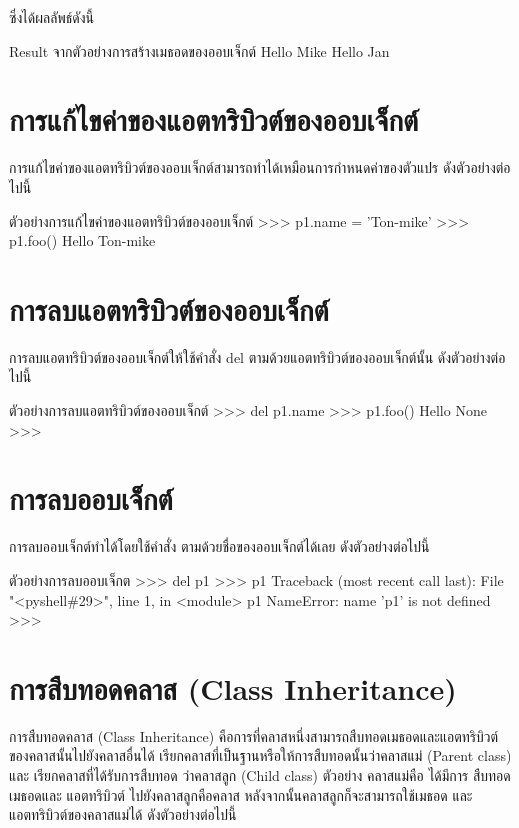 ซึ่งได้ผลลัพธ์ดังนี้
\begin{codelist}{Result จากตัวอย่างการสร้างเมธอดของออบเจ็กต์}{}
Hello Mike
Hello Jan
\end{codelist}


\section{การแก้ไขค่าของแอตทริบิวต์ของออบเจ็กต์}

การแก้ไขค่าของแอตทริบิวต์ของออบเจ็กต์สามารถทำได้เหมือนการกำหนดค่าของตัวแปร ดังตัวอย่างต่อไปนี้


\begin{codelist}{ตัวอย่างการแก้ไขค่าของแอตทริบิวต์ของออบเจ็กต์}{}
>>> p1.name = 'Ton-mike'
>>> p1.foo()
Hello Ton-mike
\end{codelist}


\section{การลบแอตทริบิวต์ของออบเจ็กต์}

การลบแอตทริบิวต์ของออบเจ็กต์ให้ใช้คำสั่ง del ตามด้วยแอตทริบิวต์ของออบเจ็กต์นั้น ดังตัวอย่างต่อไปนี้
\begin{codelist}{ตัวอย่างการลบแอตทริบิวต์ของออบเจ็กต์}{}
>>> del p1.name
>>> p1.foo()
Hello None
>>> 
\end{codelist}

\section{การลบออบเจ็กต์}

การลบออบเจ็กต์ทำได้โดยใช้คำสั่ง  ตามด้วยชื่อของออบเจ็กต์ได้เลย ดังตัวอย่างต่อไปนี้

\begin{codelist}{ตัวอย่างการลบออบเจ็กต}{}
>>> del p1
>>> p1
Traceback (most recent call last):
  File "<pyshell\#29>", line 1, in <module>
    p1
NameError: name 'p1' is not defined
>>> 
\end{codelist}

\section{การสืบทอดคลาส (Class Inheritance)}
การสืบทอดคลาส (Class Inheritance) คือการที่คลาสหนึ่งสามารถสืบทอดเมธอดและแอตทริบิวต์ ของคลาสนั้นไปยังคลาสอื่นได้ เรียกคลาสที่เป็นฐานหรือให้การสืบทอดนั้นว่าคลาสแม่ (Parent class) และ เรียกคลาสที่ได้รับการสืบทอด ว่าคลาสลูก (Child class) ตัวอย่าง คลาสแม่คือ  ได้มีการ สืบทอดเมธอดและ แอตทริบิวต์ ไปยังคลาสลูกคือคลาส  หลังจากนั้นคลาสลูกก็จะสามารถใช้เมธอด และแอตทริบิวต์ของคลาสแม่ได้ ดังตัวอย่างต่อไปนี้


